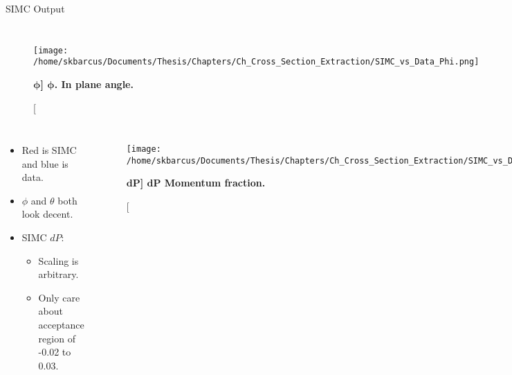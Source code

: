 \documentclass[10pt]{beamer}
\begin{document}
\begin{frame}[fragile]{SIMC Output}

		\begin{columns}[T,onlytextwidth]   	
			\begin{figure}[!ht]
			\begin{center}
			\texttt{[image: /home/skbarcus/Documents/Thesis/Chapters/Ch\_Cross\_Section\_Extraction/SIMC\_vs\_Data\_Phi.png]}
			\end{center}
			\caption[\bf{$\boldsymbol{\phi}$}]{
			{\bf{$\boldsymbol{\phi}$.}} In plane angle.}
			\label{fig:simc_phi}
			\end{figure}
		
			\begin{figure}[!ht]
			\begin{center}
			\texttt{[image: /home/skbarcus/Documents/Thesis/Chapters/Ch\_Cross\_Section\_Extraction/SIMC\_vs\_Data\_Theta.png]}
			\end{center}
			\caption[\bf{$\boldsymbol{\theta}$}]{
			{\bf{$\boldsymbol{\theta}$.}} Out of plane angle.}
			\label{fig:simc_theta}
			\end{figure}
			
		\end{columns}
		
		\begin{columns}[T,onlytextwidth]  
			\begin{itemize}
				\item {} \alert{Red} is \alert{SIMC} and  \alert{blue} is \alert{data}. 
				\item $\phi$ and $\theta$ both look decent.
				\item \alert{SIMC $dP$}: 
					\begin{itemize}
						\item[--] Scaling is arbitrary.
						\item[--] \alert{Only care about acceptance region} of -0.02 to 0.03.
					\end{itemize}
			\end{itemize}
		 	
			\begin{figure}[!ht]
			\begin{center}
			\texttt{[image: /home/skbarcus/Documents/Thesis/Chapters/Ch\_Cross\_Section\_Extraction/SIMC\_vs\_Data\_dP.png]}
			\end{center}
			\caption[\bf{$\boldsymbol{dP}$}]{
			{\bf{$\boldsymbol{dP}$}} Momentum fraction.}
			\label{fig:simc_dp}
			\end{figure}
		\end{columns}
		
\end{frame}
\end{document}
